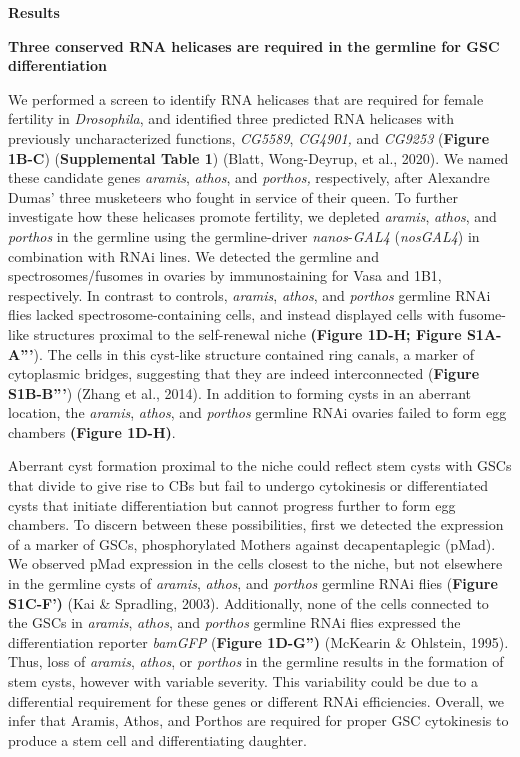 \documentclass[12pt,twoside]{reedthesis}
\begin{document}
\textbf{Results}

\textbf{Three conserved RNA helicases are required in the germline for GSC
differentiation}

We performed a screen to identify RNA helicases that are required for
female fertility in \emph{Drosophila}, and identified three predicted RNA
helicases with previously uncharacterized functions, \emph{CG5589}, \emph{CG4901,}
and \emph{CG9253} (\textbf{Figure 1B-C}) (\textbf{Supplemental Table 1})
(Blatt, Wong-Deyrup, et al., 2020). We named these candidate genes
\emph{aramis}, \emph{athos}, and \emph{porthos,} respectively, after Alexandre Dumas'
three musketeers who fought in service of their queen. To further
investigate how these helicases promote fertility, we depleted \emph{aramis},
\emph{athos}, and \emph{porthos} in the germline using the germline-driver
\emph{nanos}-\emph{GAL4} (\emph{nosGAL4}) in combination with RNAi lines. We detected
the germline and spectrosomes/fusomes in ovaries by immunostaining for
Vasa and 1B1, respectively. In contrast to controls, \emph{aramis}, \emph{athos},
and \emph{porthos} germline RNAi flies lacked spectrosome-containing cells,
and instead displayed cells with fusome-like structures proximal to the
self-renewal niche \textbf{(Figure 1D-H; Figure S1A-A'''}). The cells in this
cyst-like structure contained ring canals, a marker of cytoplasmic
bridges, suggesting that they are indeed interconnected (\textbf{Figure
S1B-B'''}) (Zhang et al., 2014). In addition to forming cysts in an
aberrant location, the \emph{aramis}, \emph{athos}, and \emph{porthos} germline RNAi
ovaries failed to form egg chambers \textbf{(Figure 1D-H)}.

Aberrant cyst formation proximal to the niche could reflect stem cysts
with GSCs that divide to give rise to CBs but fail to undergo
cytokinesis or differentiated cysts that initiate differentiation but
cannot progress further to form egg chambers. To discern between these
possibilities, first we detected the expression of a marker of GSCs,
phosphorylated Mothers against decapentaplegic (pMad). We observed pMad
expression in the cells closest to the niche, but not elsewhere in the
germline cysts of \emph{aramis}, \emph{athos}, and \emph{porthos} germline RNAi flies
(\textbf{Figure S1C-F')} (Kai \& Spradling, 2003). Additionally, none
of the cells connected to the GSCs in \emph{aramis}, \emph{athos}, and \emph{porthos}
germline RNAi flies expressed the differentiation reporter \emph{bamGFP}
(\textbf{Figure 1D-G'')} (McKearin \& Ohlstein, 1995)\emph{.} Thus, loss of \emph{aramis},
\emph{athos}, or \emph{porthos} in the germline results in the formation of stem
cysts, however with variable severity. This variability could be due to
a differential requirement for these genes or different RNAi
efficiencies. Overall, we infer that Aramis, Athos, and Porthos are
required for proper GSC cytokinesis to produce a stem cell and
differentiating daughter.
\end{document}
